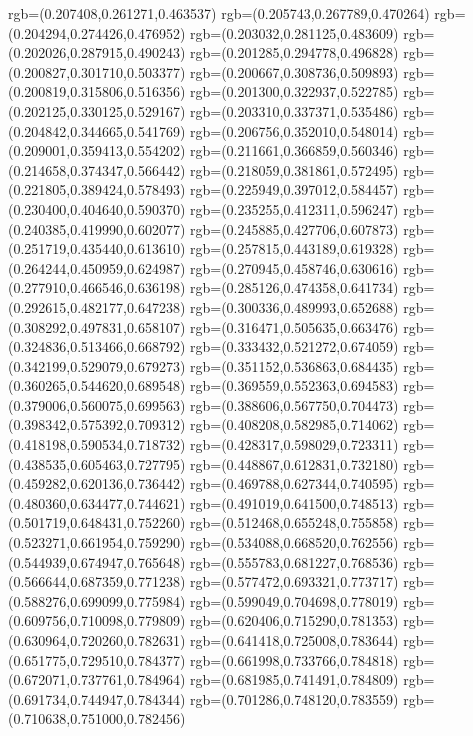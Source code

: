 {{{			rgb=(0.207408,0.261271,0.463537)
			rgb=(0.205743,0.267789,0.470264)
			rgb=(0.204294,0.274426,0.476952)
			rgb=(0.203032,0.281125,0.483609)
			rgb=(0.202026,0.287915,0.490243)
			rgb=(0.201285,0.294778,0.496828)
			rgb=(0.200827,0.301710,0.503377)
			rgb=(0.200667,0.308736,0.509893)
			rgb=(0.200819,0.315806,0.516356)
			rgb=(0.201300,0.322937,0.522785)
			rgb=(0.202125,0.330125,0.529167)
			rgb=(0.203310,0.337371,0.535486)
			rgb=(0.204842,0.344665,0.541769)
			rgb=(0.206756,0.352010,0.548014)
			rgb=(0.209001,0.359413,0.554202)
			rgb=(0.211661,0.366859,0.560346)
			rgb=(0.214658,0.374347,0.566442)
			rgb=(0.218059,0.381861,0.572495)
			rgb=(0.221805,0.389424,0.578493)
			rgb=(0.225949,0.397012,0.584457)
			rgb=(0.230400,0.404640,0.590370)
			rgb=(0.235255,0.412311,0.596247)
			rgb=(0.240385,0.419990,0.602077)
			rgb=(0.245885,0.427706,0.607873)
			rgb=(0.251719,0.435440,0.613610)
			rgb=(0.257815,0.443189,0.619328)
			rgb=(0.264244,0.450959,0.624987)
			rgb=(0.270945,0.458746,0.630616)
			rgb=(0.277910,0.466546,0.636198)
			rgb=(0.285126,0.474358,0.641734)
			rgb=(0.292615,0.482177,0.647238)
			rgb=(0.300336,0.489993,0.652688)
			rgb=(0.308292,0.497831,0.658107)
			rgb=(0.316471,0.505635,0.663476)
			rgb=(0.324836,0.513466,0.668792)
			rgb=(0.333432,0.521272,0.674059)
			rgb=(0.342199,0.529079,0.679273)
			rgb=(0.351152,0.536863,0.684435)
			rgb=(0.360265,0.544620,0.689548)
			rgb=(0.369559,0.552363,0.694583)
			rgb=(0.379006,0.560075,0.699563)
			rgb=(0.388606,0.567750,0.704473)
			rgb=(0.398342,0.575392,0.709312)
			rgb=(0.408208,0.582985,0.714062)
			rgb=(0.418198,0.590534,0.718732)
			rgb=(0.428317,0.598029,0.723311)
			rgb=(0.438535,0.605463,0.727795)
			rgb=(0.448867,0.612831,0.732180)
			rgb=(0.459282,0.620136,0.736442)
			rgb=(0.469788,0.627344,0.740595)
			rgb=(0.480360,0.634477,0.744621)
			rgb=(0.491019,0.641500,0.748513)
			rgb=(0.501719,0.648431,0.752260)
			rgb=(0.512468,0.655248,0.755858)
			rgb=(0.523271,0.661954,0.759290)
			rgb=(0.534088,0.668520,0.762556)
			rgb=(0.544939,0.674947,0.765648)
			rgb=(0.555783,0.681227,0.768536)
			rgb=(0.566644,0.687359,0.771238)
			rgb=(0.577472,0.693321,0.773717)
			rgb=(0.588276,0.699099,0.775984)
			rgb=(0.599049,0.704698,0.778019)
			rgb=(0.609756,0.710098,0.779809)
			rgb=(0.620406,0.715290,0.781353)
			rgb=(0.630964,0.720260,0.782631)
			rgb=(0.641418,0.725008,0.783644)
			rgb=(0.651775,0.729510,0.784377)
			rgb=(0.661998,0.733766,0.784818)
			rgb=(0.672071,0.737761,0.784964)
			rgb=(0.681985,0.741491,0.784809)
			rgb=(0.691734,0.744947,0.784344)
			rgb=(0.701286,0.748120,0.783559)
			rgb=(0.710638,0.751000,0.782456)
}}}
